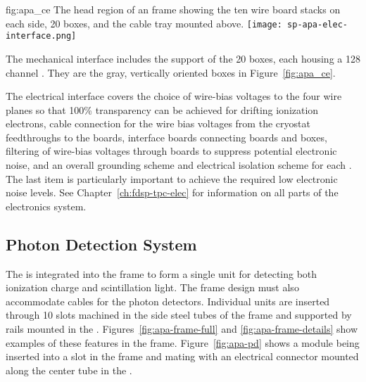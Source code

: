 \begin{dunefigure}{fig:apa_ce}
{The head region of an  frame showing the ten wire board stacks on each side, \num{20}  boxes, and the cable tray mounted above.}
\texttt{[image: sp-apa-elec-interface.png]}
\end{dunefigure}

The mechanical interface includes the support of the \num{20}  boxes, each housing a \num{128} channel .  They are the gray, vertically oriented boxes  in Figure~\ref{fig:apa_ce}. 

The electrical interface covers the choice of wire-bias voltages to the four wire planes so that \num{100}\% transparency can be achieved for drifting ionization electrons, cable connection for the wire bias voltages from the cryostat feedthroughs to the  boards, interface boards connecting  boards and  boxes, filtering of wire-bias voltages through  boards to suppress potential electronic noise, and an overall grounding scheme and electrical isolation scheme for each . The last item is particularly important to achieve the required low electronic noise levels.  See Chapter~\ref{ch:fdsp-tpc-elec} for information on all parts of the  electronics system.


\subsection{Photon Detection System}
\label{sec:fdsp-apa-intfc-pds}

The  is integrated into the  frame to form a single unit for detecting both ionization charge and scintillation light.  The  frame design must also accommodate cables for the photon detectors.  %
Individual  units are inserted through \num{10} slots machined in the side steel tubes of the frame and supported by rails mounted in the . Figures~\ref{fig:apa-frame-full} and \ref{fig:apa-frame-details} show examples of these features in the frame. Figure~\ref{fig:apa-pd} shows a  module being inserted into a slot in the frame and mating with an electrical connector mounted along the center tube in the .

